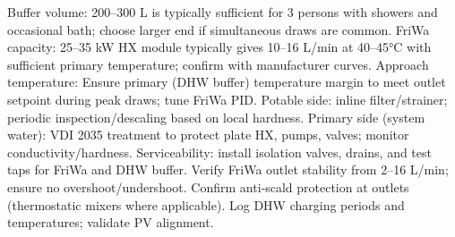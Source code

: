 \markdownRendererUlEndTight \markdownRendererInterblockSeparator
{}
\markdownRendererSectionEnd \markdownRendererSectionBegin
{}\markdownRendererInterblockSeparator
{}\markdownRendererUlBeginTight
\markdownRendererUlItem Buffer volume: 200–300 L is typically sufficient for 3 persons with showers and occasional bath; choose larger end if simultaneous draws are common.\markdownRendererUlItemEnd 
\markdownRendererUlItem FriWa capacity: 25–35 kW HX module typically gives 10–16 L/min at 40–45°C with sufficient primary temperature; confirm with manufacturer curves.\markdownRendererUlItemEnd 
\markdownRendererUlItem Approach temperature: Ensure primary (DHW buffer) temperature margin to meet outlet setpoint during peak draws; tune FriWa PID.\markdownRendererUlItemEnd 
\markdownRendererUlEndTight \markdownRendererInterblockSeparator
{}
\markdownRendererSectionEnd \markdownRendererSectionBegin
{}\markdownRendererInterblockSeparator
{}\markdownRendererUlBeginTight
\markdownRendererUlItem Potable side: inline filter/strainer; periodic inspection/descaling based on local hardness.\markdownRendererUlItemEnd 
\markdownRendererUlItem Primary side (system water): VDI 2035 treatment to protect plate HX, pumps, valves; monitor conductivity/hardness.\markdownRendererUlItemEnd 
\markdownRendererUlItem Serviceability: install isolation valves, drains, and test taps for FriWa and DHW buffer.\markdownRendererUlItemEnd 
\markdownRendererUlEndTight \markdownRendererInterblockSeparator
{}
\markdownRendererSectionEnd \markdownRendererSectionBegin
{}\markdownRendererInterblockSeparator
{}\markdownRendererUlBeginTight
\markdownRendererUlItem Verify FriWa outlet stability from 2–16 L/min; ensure no overshoot/undershoot.\markdownRendererUlItemEnd 
\markdownRendererUlItem Confirm anti‑scald protection at outlets (thermostatic mixers where applicable).\markdownRendererUlItemEnd 
\markdownRendererUlItem Log DHW charging periods and temperatures; validate PV alignment.\markdownRendererUlItemEnd 
\markdownRendererUlEndTight 
\markdownRendererSectionEnd 
\markdownRendererSectionEnd \markdownRendererDocumentEnd